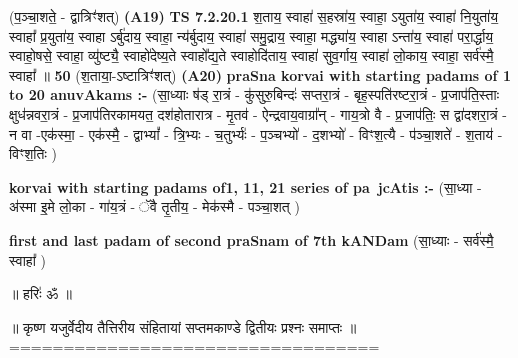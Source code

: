 \documentclass[17pt]{extarticle}
\begin{document}
                  \newline
                      (प॒ञ्चा॒शते॒ - द्वात्रिꣳ॑शत्)  \textbf{(A19)} \newline \newline
                                        \textbf{ TS 7.2.20.1} \newline
                  श॒ताय॒ स्वाहा॑ स॒हस्रा॑य॒ स्वाहा॒ ऽयुता॑य॒ स्वाहा॑ नि॒युता॑य॒ स्वाहा᳚ प्र॒युता॑य॒ स्वाहा ऽर्बु॑दाय॒ स्वाहा॒ न्य॑र्बुदाय॒ स्वाहा॑ समु॒द्राय॒ स्वाहा॒ मद्ध्या॑य॒ स्वाहा ऽन्ता॑य॒ स्वाहा॑ परा॒र्द्धाय॒ स्वाहो॒षसे॒ स्वाहा॒ व्यु॑ष्ट्यै॒ स्वाहो॑देष्य॒ते स्वाहो᳚द्य॒ते स्वाहोदि॑ताय॒ स्वाहा॑ सुव॒र्गाय॒ स्वाहा॑ लो॒काय॒ स्वाहा॒ सर्व॑स्मै॒ स्वाहा᳚ ॥ \textbf{  50 } \newline
                  \newline
                      (श॒ताया॒-ऽष्टात्रिꣳ॑शत्)  \textbf{(A20)} \newline \newline
                \textbf{praSna korvai with starting padams of 1 to 20 anuvAkams :-} \newline
        (सा॒ध्याः ष॑ड् रा॒त्रं - कु॑सुरु॒बिन्दः॑ सप्तरा॒त्रं - बृह॒स्पति॑रष्टरा॒त्रं - प्र॒जाप॑ति॒स्ताः क्षुध॑न्नवरा॒त्रं - प्र॒जाप॑तिरकामयत॒ दश॑होतारात्र - मृ॒तव॑ - ऐन्द्रवाय॒वाग्रा᳚न् - गाय॒त्रो वै - प्र॒जाप॑तिः॒ स द्वा॑दशरा॒त्रं - न वा -एक॑स्मा॒ - एक॑स्मै॒ - द्वाभ्यां᳚ - त्रि॒भ्यः - च॒तुर्भ्यः॑ - प॒ञ्चभ्यो॑ - द॒शभ्यो॑ - विꣳश॒त्यै - प॑ञ्चा॒शते॑ - श॒ताय॑ - विꣳश॒तिः ) \newline

        \textbf{korvai with starting padams of1, 11, 21 series of pa~jcAtis :-} \newline
        (सा॒ध्या - अ॑स्मा इ॒मे लो॒का - गा॑य॒त्रं - ॅवै तृ॒तीय॒ - मेक॑स्मै - पञ्चा॒शत् ) \newline

        \textbf{first and last padam of second praSnam of 7th kANDam} \newline
        (सा॒ध्याः - सर्व॑स्मै॒ स्वाहा᳚ ) \newline 

        
        ॥ हरिः॑ ॐ ॥

॥ कृष्ण यजुर्वेदीय तैत्तिरीय संहितायां सप्तमकाण्डे द्वितीयः प्रश्नः समाप्तः ॥
================================== \newline
        \pagebreak
                \pagebreak
        
\end{document}
